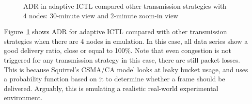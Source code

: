 \documentclass[12pt]{report}
\begin{document}
\begin{figure}[H]
  \caption{\label{fig:adaptive_adr_4}ADR in adaptive ICTL compared other transmission strategies with 4 nodes: 30-minute view and 2-minute zoom-in view}
\end{figure}

Figure~\ref{fig:adaptive_adr_4} shows ADR for adaptive ICTL compared with other transmission strategies when there are 4 nodes in emulation. In this case, all data series show a good delivery ratio, close or equal to 100\%. Note that even congestion is not triggered for any transmission strategy in this case, there are still packet losses. This is because Squirrel's CSMA/CA model looks at leaky bucket usage, and uses a probability function based on it to determine whether a frame should be delivered. Arguably, this is emulating a realistic real-world experimental environment.
\end{document}
